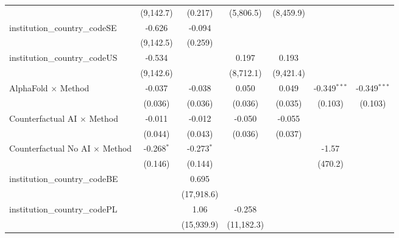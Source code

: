\begin{tabular}{lcccccc}
                                         & (9,142.7)     & (0.217)        & (5,806.5)     & (8,459.9)     &                &   \\   
   institution\_country\_codeSE          & -0.626        & -0.094         &               &               &                &   \\   
                                         & (9,142.5)     & (0.259)        &               &               &                &   \\   
   institution\_country\_codeUS          & -0.534        &                & 0.197         & 0.193         &                &   \\   
                                         & (9,142.6)     &                & (8,712.1)     & (9,421.4)     &                &   \\   
   AlphaFold $\times$ Method             & -0.037        & -0.038         & 0.050         & 0.049         & -0.349$^{***}$ & -0.349$^{***}$\\   
                                         & (0.036)       & (0.036)        & (0.036)       & (0.035)       & (0.103)        & (0.103)\\   
   Counterfactual AI $\times$ Method     & -0.011        & -0.012         & -0.050        & -0.055        &                &   \\   
                                         & (0.044)       & (0.043)        & (0.036)       & (0.037)       &                &   \\   
   Counterfactual No AI $\times$ Method  & -0.268$^{*}$  & -0.273$^{*}$   &               &               & -1.57          &   \\   
                                         & (0.146)       & (0.144)        &               &               & (470.2)        &   \\   
   institution\_country\_codeBE          &               & 0.695          &               &               &                &   \\   
                                         &               & (17,918.6)     &               &               &                &   \\   
   institution\_country\_codePL          &               & 1.06           & -0.258        &               &                &   \\   
                                         &               & (15,939.9)     & (11,182.3)    &               &                &   \\   

\end{tabular}
